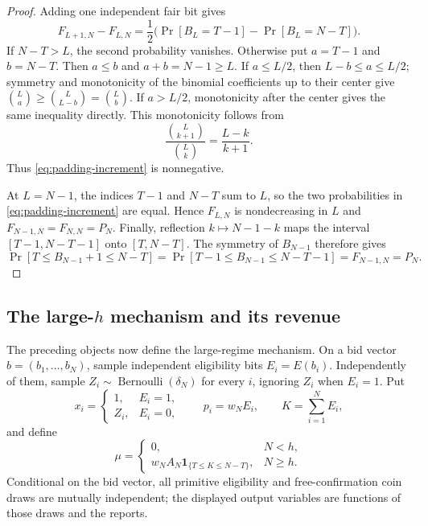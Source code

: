 \documentclass[11pt]{article}
\begin{document}
\begin{proof}
Adding one independent fair bit gives
\begin{equation}
F_{L+1,N}-F_{L,N}
=\frac12\bigl(\Pr[B_L=T-1]-\Pr[B_L=N-T]\bigr).
\label{eq:padding-increment}
\end{equation}
If $N-T>L$, the second probability vanishes.  Otherwise put $a=T-1$ and
$b=N-T$.  Then $a\le b$ and $a+b=N-1\ge L$.  If $a\le L/2$, then
$L-b\le a\le L/2$; symmetry and monotonicity of the binomial coefficients up
to their center give
$\binom{L}{a}\ge\binom{L}{L-b}=\binom{L}{b}$.  If $a>L/2$, monotonicity after
the center gives the same inequality directly.  This monotonicity follows
from
\[
\frac{\binom{L}{k+1}}{\binom{L}{k}}=\frac{L-k}{k+1}.
\]
Thus \eqref{eq:padding-increment} is nonnegative.

At $L=N-1$, the indices $T-1$ and $N-T$ sum to $L$, so the two probabilities
in \eqref{eq:padding-increment} are equal.  Hence $F_{L,N}$ is nondecreasing
in $L$ and
$F_{N-1,N}=F_{N,N}=P_N$.  Finally, reflection
$k\mapsto N-1-k$ maps the interval $[T-1,N-T-1]$ onto $[T,N-T]$.
The symmetry of $B_{N-1}$ therefore gives
\[
\Pr[T\le B_{N-1}+1\le N-T]
=\Pr[T-1\le B_{N-1}\le N-T-1]
=F_{N-1,N}=P_N.
\]
\end{proof}

\subsection{The large-\texorpdfstring{$h$}{h} mechanism and its revenue}

The preceding objects now define the large-regime mechanism.  On a bid vector
$b=(b_1,\ldots,b_N)$, sample independent eligibility bits
$E_i=E(b_i)$.  Independently of them, sample
$Z_i\sim\operatorname{Bernoulli}(\delta_N)$ for every $i$, ignoring $Z_i$
when $E_i=1$.  Put
\begin{equation}
x_i=
\begin{cases}
1,&E_i=1,\\
Z_i,&E_i=0,
\end{cases}
\qquad
p_i=w_NE_i,
\qquad
K=\sum_{i=1}^N E_i,
\label{eq:large-user-rule}
\end{equation}
and define
\begin{equation}
\mu=
\begin{cases}
0,&N<h,\\
w_NA_N\mathbf{1}_{\{T\le K\le N-T\}},&N\ge h.
\end{cases}
\label{eq:large-revenue-rule}
\end{equation}
Conditional on the bid vector, all primitive eligibility and free-confirmation
coin draws are mutually independent; the displayed output variables are
functions of those draws and the reports.
\end{document}
